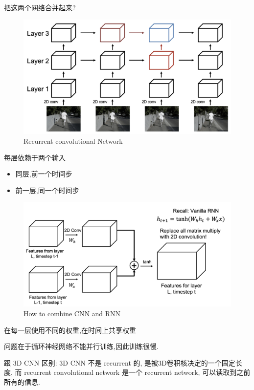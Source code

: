 把这两个网络合并起来?

\begin{figure}[H]
    \centering
    \includegraphics[scale=0.2]{figures/recu_CNN.png}
    \caption{Recurrent convolutional Network}
\end{figure}

每层依赖于两个输入
\begin{itemize}
    \item 同层,前一个时间步
    \item 前一层,同一个时间步
\end{itemize}

\begin{figure}[H]
    \centering
    \includegraphics[scale=0.2]{figures/recur_CNN_detail.png}
    \caption{How to combine CNN and RNN}
\end{figure}

在每一层使用不同的权重,在时间上共享权重

问题在于循环神经网络不能并行训练,因此训练很慢.

跟 3D CNN 区别: 3D CNN 不是 recurrent 的, 是被3D卷积核决定的一个固定长度, 
而 recurrent convolutional network 是一个 recurrent network, 可以读取到之前所有的信息.
